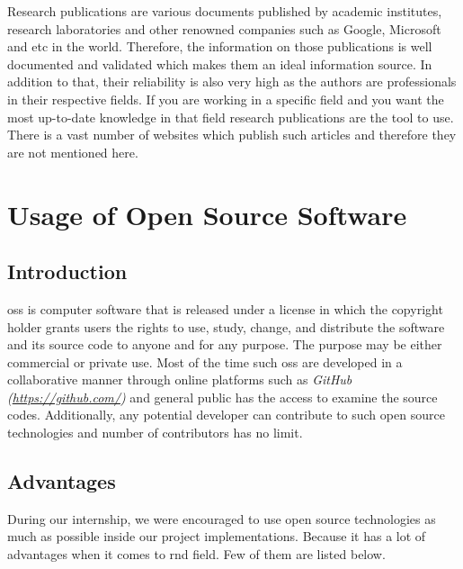 \documentclass[a4paper,12pt]{report}
\begin{document}
Research publications are various documents published by academic institutes, research laboratories and other renowned companies such as Google, Microsoft and etc in the world. Therefore, the information on those publications is well documented and validated which makes them an ideal information source. In addition to that, their reliability is also very high as the authors are professionals in their respective fields. If you are working in a specific field and you want the most up-to-date knowledge in that field research publications are the tool to use. There is a vast number of websites which publish such articles and therefore they are not mentioned here.




\section{Usage of Open Source Software}

\subsection{Introduction}

\Ac{oss} is computer software that is released under a license in which the copyright holder grants users the rights to use, study, change, and distribute the software and its source code to anyone and for any purpose\cite{oss}. The purpose may be either commercial or private use. Most of the time such \ac{oss} are developed in a collaborative manner through  online platforms such as \textit{GitHub (\url{https://github.com/})} and general public has the access to examine the source codes. Additionally, any potential developer can contribute to such open source technologies and number of contributors has no limit.


\subsection{Advantages}

During our internship, we were encouraged  to use open source technologies as much as possible inside our project implementations. Because it has a lot of advantages when it comes to \ac{rnd} field. Few of them are listed below.
\end{document}
